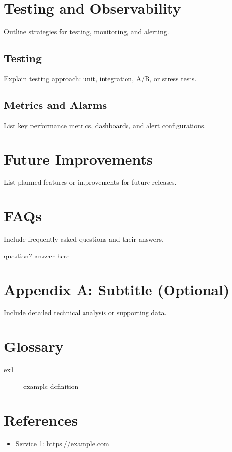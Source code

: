 \documentclass[12pt,a4paper]{article}
\begin{document}
\newpage
\section{Testing and Observability}
Outline strategies for testing, monitoring, and alerting.

\subsection{Testing}
Explain testing approach: unit, integration, A/B, or stress tests.

\subsection{Metrics and Alarms}
List key performance metrics, dashboards, and alert configurations.

\newpage
\section{Future Improvements}
List planned features or improvements for future releases.

\newpage
\section{FAQs}
Include frequently asked questions and their answers.

question?
answer here

\newpage
\appendix
\section{Appendix A: Subtitle (Optional)}
Include detailed technical analysis or supporting data.

\newpage
\section{Glossary}
\begin{description}
  \item[ex1] example definition
\end{description}

\newpage
\section{References}
\begin{itemize}
  \item Service 1: \url{https://example.com}
\end{itemize}
\end{document}
